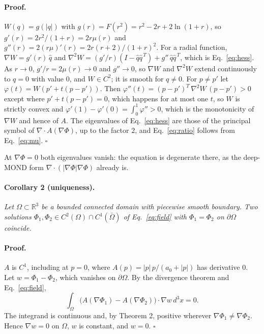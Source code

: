 \documentclass[twocolumn]{iopjournal}
\begin{document}
\paragraph{Proof.} $W(q) = g(|q|)$ with
$g(r) = F(r^2) = r^2 - 2r + 2\ln(1+r)$, so
$g'(r) = 2r^2/(1+r) = 2r\mu(r)$ and $g''(r) = 2(r\mu)'(r)
= 2r(r+2)/(1+r)^2$. For a radial function,
$\nabla W = g'(r)\,\hat q$ and
$\nabla^2 W = (g'/r)(I - \hat q\hat q^{\,T}) + g''\,\hat q\hat q^{\,T}$,
which is Eq.~\eqref{eq:hess}. As $r \to 0$, $g'/r = 2\mu(r) \to 0$
and $g'' \to 0$, so $\nabla W$ and $\nabla^2 W$ extend continuously
to $q = 0$ with value $0$, and $W \in C^2$; it is smooth for
$q \neq 0$. For $p \neq p'$ let
$\varphi(t) = W(p' + t(p - p'))$. Then
$\varphi''(t) = (p - p')^T\,\nabla^2 W\,(p - p') > 0$ except where
$p' + t(p - p') = 0$, which happens for at most one $t$, so $W$ is
strictly convex and
$\varphi'(1) - \varphi'(0) = \int_0^1 \varphi'' > 0$, which is the
monotonicity of $\nabla W$ and hence of $A$. The eigenvalues of
Eq.~\eqref{eq:hess} are those of the principal symbol of
$\nabla\cdot A(\nabla\Phi)$, up to the factor $2$, and
Eq.~\eqref{eq:ratio} follows from Eq.~\eqref{eq:mu}. \hfill
$\square$

\medskip
\noindent
At $\nabla\Phi = 0$ both eigenvalues vanish: the equation is
degenerate there, as the deep-MOND form
$\nabla\cdot(|\nabla\Phi|\nabla\Phi)$ already is.

\paragraph{Corollary 2 (uniqueness).} \textit{Let
$\Omega \subset \mathbb{R}^3$ be a bounded connected domain with
piecewise smooth boundary. Two solutions
$\Phi_1, \Phi_2 \in C^2(\Omega) \cap C^1(\bar\Omega)$ of
Eq.~\eqref{eq:field} with $\Phi_1 = \Phi_2$ on $\partial\Omega$
coincide.}

\paragraph{Proof.} $A$ is $C^1$, including at $p = 0$, where
$A(p) = |p|\,p/(a_0 + |p|)$ has derivative $0$. Let
$w = \Phi_1 - \Phi_2$, which vanishes on $\partial\Omega$. By the
divergence theorem and Eq.~\eqref{eq:field},
\begin{equation}
  \int_\Omega \big(A(\nabla\Phi_1) - A(\nabla\Phi_2)\big)
  \cdot\nabla w \, d^3x = 0 .
\end{equation}
The integrand is continuous and, by Theorem 2, positive wherever
$\nabla\Phi_1 \neq \nabla\Phi_2$. Hence $\nabla w = 0$ on $\Omega$,
$w$ is constant, and $w = 0$. \hfill $\square$
\end{document}
